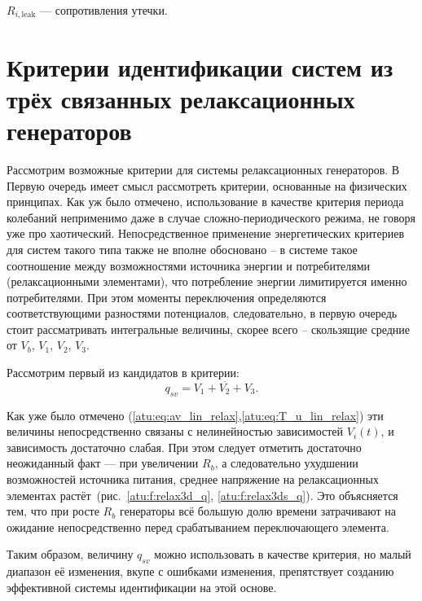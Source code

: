 $R_{i,\mathrm{leak}}$ --- сопротивления утечки.


\section{Критерии идентификации систем из трёх связанных релаксационных генераторов}

Рассмотрим возможные критерии для системы релаксационных
генераторов. В Первую очередь имеет смысл
рассмотреть критерии, основанные на физических принципах.
Как уж было отмечено, использование в качестве критерия периода
колебаний неприменимо даже в случае сложно-периодического режима,
не говоря уже про хаотический.
Непосредственное применение энергетических критериев
для систем такого типа также не вполне обосновано --
в системе такое соотношение между возможностями источника энергии
и потребителями (релаксационными элементами), что
потребление энергии лимитируется именно потребителями.
При этом моменты переключения определяются соответствующими разностями
потенциалов, следовательно, в первую очередь стоит рассматривать
интегральные величины, скорее всего -- скользящие средние
от $V_b$, $V_1$, $V_2$, $V_3$.

Рассмотрим первый из кандидатов в критерии:
\begin{equation}
  q_{sv} = \overline{V_1+V_2+V_3} .
  \label{atu:eq:q_sv_relax}
\end{equation}


Как уже было отмечено (\ref{atu:eq:av_lin_relax},\ref{atu:eq:T_u_lin_relax})
эти величины непосредственно связаны с нелинейностью
зависимостей $V_i(t)$, и зависимость достаточно слабая.
При этом следует отметить достаточно неожиданный факт ---
при увеличении $R_b$, а следовательно ухудшении
возможностей источника питания, среднее напряжение
на релаксационных элементах растёт~(рис.~\ref{atu:f:relax3d_q}, \ref{atu:f:relax3ds_q}).
Это объясняется тем,
что при росте $R_b$ генераторы всё большую долю времени
затрачивают на ожидание непосредственно перед срабатыванием переключающего
элемента.

Таким образом, величину $q_{sv}$ можно использовать в качестве критерия,
но малый диапазон её изменения, вкупе с ошибками изменения,
препятствует созданию эффективной системы идентификации на этой основе.


